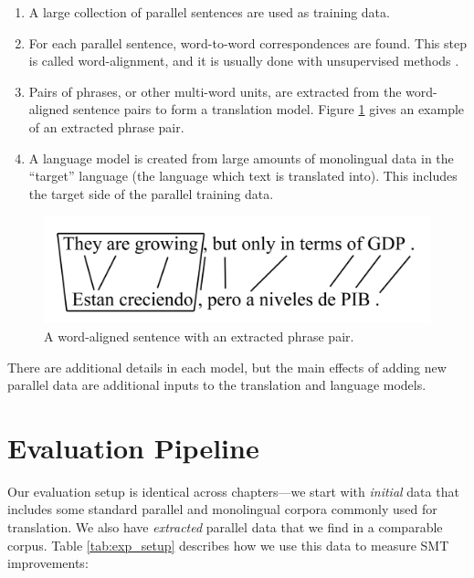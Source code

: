\begin{enumerate}
\item A large collection of parallel sentences are used as training data.
\item For each parallel sentence, word-to-word correspondences are found. This
step is called word-alignment, and it is usually done with unsupervised methods
\citep{Brown93,Vogel96}.
\item {} Pairs of phrases, or other multi-word units, are extracted from the
word-aligned sentence pairs to form a translation model. Figure
\ref{fig:phrase_align} gives an example of an extracted phrase pair.
\item A  language model is created from large amounts of monolingual data in the
``target'' language (the language which text is translated into). This includes
the target side of the parallel training data.
\end{enumerate}

\begin{figure}[ht]
\includegraphics[width=\textwidth]{images/phrase_align.jpg}
\caption{A word-aligned sentence with an extracted phrase pair.}
\label{fig:phrase_align}
\end{figure}

There are additional details in each model, but the main effects of adding new
parallel data are additional inputs to the translation and language models.

\section{Evaluation Pipeline}
Our evaluation setup is identical across chapters---we start with {\em initial}
data that includes some standard parallel and monolingual corpora commonly used for 
translation. We also have {\em extracted} parallel data that we find in a comparable
corpus. Table \ref{tab:exp_setup} describes how we use this data to measure SMT
improvements:


